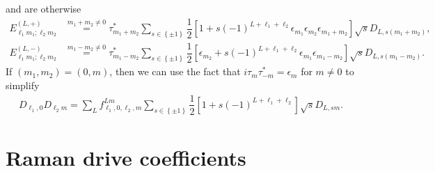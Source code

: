 \documentclass[nofootinbib,notitlepage,11pt]{revtex4-2}
\newcommand{\f}[2]{\dfrac{#1}{#2}} %
\newcommand{\p}[1]{\left(#1\right)} %
\renewcommand{\sp}[1]{\left[#1\right]} %
\renewcommand{\set}[1]{\left\{#1\right\}} %
\newcommand{\1}{\mathds{1}}
\begin{document}
and are otherwise
\begin{align}
  E_{\ell_1 m_1;\ell_2 m_2}^{(L,+)}
  &\stackrel{m_1+m_2\ne0}{=}
  \tau_{m_1+m_2}^* \sum_{s\in\set{\pm1}}
  \f12 \sp{1 + s \p{-1}^{L+\ell_1+\ell_2}
    \epsilon_{m_1} \epsilon_{m_2} \epsilon_{m_1+m_2}}
  \sqrt{s} D_{L,s\p{m_1+m_2}}, \\
  E_{\ell_1 m_1;\ell_2 m_2}^{(L,-)}
  &\stackrel{m_1-m_2\ne0}{=}
  \tau_{m_1-m_2}^* \sum_{s\in\set{\pm1}}
  \f12 \sp{\epsilon_{m_2} + s \p{-1}^{L+\ell_1+\ell_2}
    \epsilon_{m_1} \epsilon_{m_1-m_2}}
  \sqrt{s} D_{L,s\p{m_1-m_2}}.
\end{align}
If $\p{m_1,m_2}=\p{0,m}$, then we can use the fact that
$i\tau_m\tau_{-m}^*=\epsilon_m$ for $m\ne0$ to simplify
\begin{align}
  D_{\ell_1,0} D_{\ell_2 m}
  = \sum_L f_{\ell_1,0,\ell_2,m}^{Lm}
  \sum_{s\in\set{\pm1}} \f12 \sp{1 + s \p{-1}^{L+\ell_1+\ell_2}}
  \sqrt{s} D_{L,sm}.
\end{align}

\section{Raman drive coefficients}
\label{sec:drive_raman_coeff}
\end{document}
